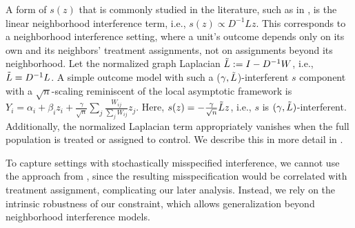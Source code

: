 \documentclass[12pt]{article}
\theoremstyle{definition}
\numberwithin{equation}{section}
\numberwithin{figure}{section}
\numberwithin{equation}{section}
\numberwithin{figure}{section}
\begin{document}
\begin{example} \label{neighborhood_interference}
A form of $s(z)$ that is commonly studied in the literature, such as in \cite{chin2019regression, eckles2017design, harshaw2023design, yu2022estimating}, is the linear neighborhood interference term, i.e., $s(z) \propto D^{-1}Lz$. This corresponds to a neighborhood interference setting, where a unit’s outcome depends only on its own and its neighbors’ treatment assignments, not on assignments beyond its neighborhood. Let the normalized graph Laplacian $\Tilde{L} := I-D^{-1}W$, i.e., $\Tilde{L} = D^{-1}L$. A simple outcome model with such a ($\gamma, \Tilde{L}$)-interferent $s$ component with a $\sqrt{n}$-scaling reminiscent of the local asymptotic framework \citep{viviano2023causal, hirano2009asymptotics} is
$Y_i = \alpha_i + \beta_i z_i + \frac{\gamma}{\sqrt{n}} \sum_{j} \frac{W_{ij}}{\sum_j W_{ij}} z_j$. Here, $s(z) = -  \frac{\gamma}{\sqrt{n}} \Tilde{L} z$, i.e., $s$ is $(\gamma, \Tilde{L})$-interferent. Additionally, the normalized Laplacian term appropriately vanishes when the full population is treated or assigned to control. We describe this in more detail in .
\end{example}

To capture settings with stochastically misspecified interference, we cannot use the approach from , since the resulting misspecification would be correlated with treatment assignment, complicating our later analysis. Instead, we rely on the intrinsic robustness of our constraint, which allows generalization beyond neighborhood interference models. 
\end{document}
